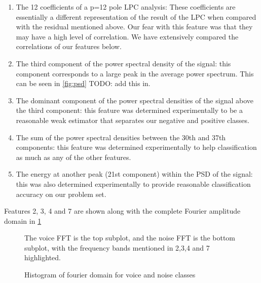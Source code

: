 \documentclass[ %
                    author={Sam Phippen},
                supervisor={Dr. Rafal Bogacz},
                     title={Real time voice activity detectors in noisy personal computing environments},
                  subtitle={},
                    degree={MEng},
                      year={2012} ]{thesis}
\begin{document}
\begin{enumerate}
    \item The 12 coefficients of a p=12 pole LPC analysis: These coefficients
        are essentially a different representation of the result of the LPC
        when compared with the residual mentioned above. Our fear with this
        feature was that they may have a high level of correlation. We have
        extensively compared the correlations of our features below.

    \item The third component of the power spectral density of the signal: this
        component corresponds to a large peak in the average power spectrum.
        This can be seen in \ref{fig:psd} TODO: add this in.

    \item The dominant component of the power spectral densities of the signal
        above the third component: this feature was determined experimentally
        to be a reasonable weak estimator that separates our negative and
        positive classes.

    \item The sum of the power spectral densities between the 30th and 37th
        components: this feature was determined experimentally to help
        classification as much as any of the other features.

    \item The energy at another peak (21st component) within the PSD of the
        signal: this was also determined experimentally to provide reasonable
        classification accuracy on our problem set.

\end{enumerate}

Features 2, 3, 4 and 7 are shown along with the complete Fourier amplitude
domain in \ref{fig:frequencies}

\begin{figure} \label{fig:frequencies}  The voice FFT is the top
    subplot, and the noise FFT is the bottom subplot, with the frequency bands
    mentioned in 2,3,4 and 7 highlighted.

    \caption{Histogram of fourier domain for voice and noise classes}
\end{figure}
\end{document}
